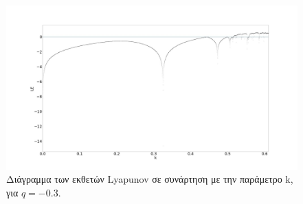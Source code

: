\begin{figure}[ht]
	\centering
	\includegraphics[width=1\linewidth]{LateX images/graphs q03/g2}
	\caption{ Διάγραμμα των εκθετών Lyapunov σε συνάρτηση με την παράμετρο k, για $q=-0.3$.}
	\label{f:g9}
\end{figure}

